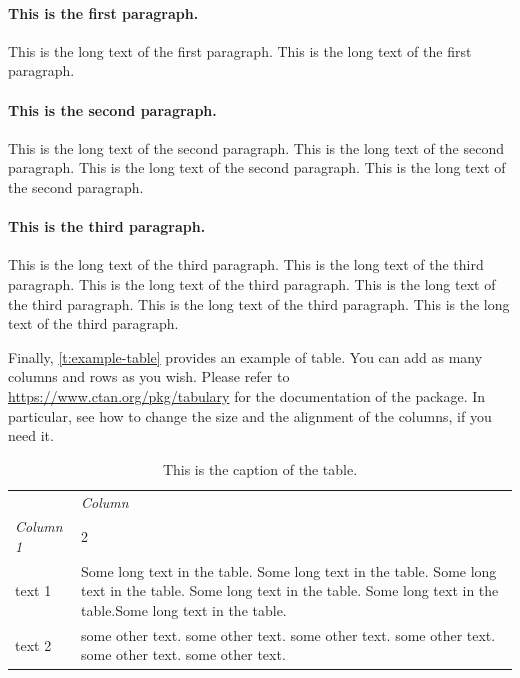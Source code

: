 \paragraph{This is the first paragraph.}
This is the long text of the first paragraph.
This is the long text of the first paragraph.

\paragraph{This is the second paragraph.}
This is the long text of the second paragraph.
This is the long text of the second paragraph.
This is the long text of the second paragraph.
This is the long text of the second paragraph.

\paragraph{This is the third paragraph.}
This is the long text of the third paragraph.
This is the long text of the third paragraph.
This is the long text of the third paragraph.
This is the long text of the third paragraph.
This is the long text of the third paragraph.
This is the long text of the third paragraph.

Finally, \cref{t:example-table} provides an example of table.
You can add as many columns and rows as you wish.
Please refer to \url{https://www.ctan.org/pkg/tabulary} for the documentation of the package.
In particular, see how to change the size and the alignment of the columns, if you need it.

\begin{table}
\centering
\begin{tabulary}{\textwidth}{lL}
\toprule
{} & \emph{Column} \\
\emph{Column 1} & 2 \\
\midrule
text 1 & Some long text in the table. Some long text in the table. Some long text in the table. Some long text in the table. Some long text in the table.Some long text in the table. \\
text 2 & some other text. some other text. some other text. some other text. some other text. some other text. \\
\bottomrule
\end{tabulary}
\caption[This is the title of the table that goes in the list of tables]{This is the caption of the table.\label{tab:example-table}}
\end{table}

